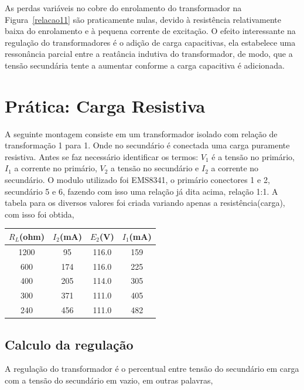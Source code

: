 \documentclass[paper=a4, fontsize=11pt]{article}
\begin{document}
As perdas variáveis no cobre do enrolamento do transformador na Figura~\ref{relacao11}
são praticamente nulas, devido à resistência relativamente baixa do enrolamento e à
pequena corrente de excitação. O efeito interessante na regulação do transformadores
é o adição de carga capacitivas, ela estabelece uma ressonância parcial entre a 
reatância indutiva do transformador, de modo, que a tensão secundária tente a aumentar
conforme a carga capacitiva é adicionada.

\section{Prática: Carga Resistiva}

A seguinte montagem consiste em um transformador isolado com relação de transformação
1 para 1. Onde no secundário é conectada uma carga puramente resistiva. Antes se faz 
necessário identificar os termos: $V_1$ é a tensão no primário, $I_1$ a corrente 
no primário, $V_2$ a tensão no secundário e $I_2$ a corrente no secundário. O modulo
utilizado foi EMS8341, o primário conectores 1 e 2, secundário 5 e 6, fazendo 
com isso uma relação já dita acima, relação 1:1. A tabela para os diversos valores
foi criada variando apenas a resistência(carga), com isso foi obtida,

\renewcommand{\arraystretch}{1.5}
\begin{center}

    \begin{tabular}{c||c||c||c}
        $R_L$(ohm) & $I_2$(mA) & $E_2$(V) & $I_1$(mA) \\
        \hline
        1200 & 95 & 116.0 & 159 \\
        600 & 174 & 116.0 & 225 \\
        400 & 205 & 114.0 & 305 \\
        300 & 371 & 111.0 & 405 \\
        240 & 456 & 111.0 & 482 \\
    \end{tabular}
\end{center}

\subsection{Calculo da regulação}

A regulação do transformador é o percentual entre tensão do secundário em carga
com a tensão do secundário em vazio, em outras palavras,
\end{document}
